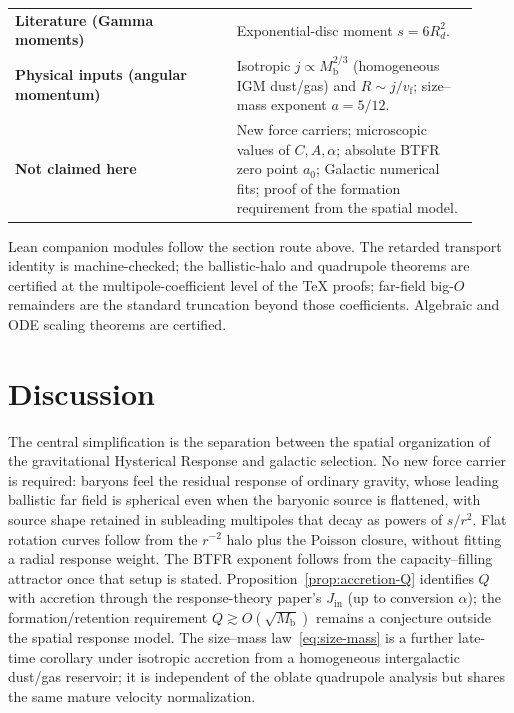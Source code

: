 \documentclass[11pt]{article}
\theoremstyle{definition}
\theoremstyle{remark}
\newcommand{\Mb}{M_{\mathrm{b}}}
\newcommand{\vf}{v_{\mathrm{f}}}
\begin{document}
\begin{center}
\begin{tabular}{@{}p{0.44\linewidth}p{0.48\linewidth}@{}}
\textbf{Literature (Gamma moments)} & Exponential-disc moment $s=6R_{d}^{2}$.\\
\textbf{Physical inputs (angular momentum)} & Isotropic $j\propto\Mb^{2/3}$ (homogeneous IGM dust/gas) and $R\sim j/\vf$; size--mass exponent $a=5/12$.\\
\textbf{Not claimed here} & New force carriers; microscopic values of $C,A,\alpha$; absolute BTFR zero point $a_0$; Galactic numerical fits; proof of the formation requirement from the spatial model.\\
\bottomrule
\end{tabular}
\end{center}

Lean companion modules follow the section route above.
The retarded transport identity is machine-checked; the ballistic-halo and quadrupole theorems are certified at the multipole-coefficient level of the TeX proofs; far-field big-$O$ remainders are the standard truncation beyond those coefficients. Algebraic and ODE scaling theorems are certified.


\section{Discussion}
\label{sec:discussion}
The central simplification is the separation between the spatial organization of the gravitational Hysterical Response and galactic selection.
No new force carrier is required: baryons feel the residual response of ordinary gravity, whose leading ballistic far field is spherical even when the baryonic source is flattened, with source shape retained in subleading multipoles that decay as powers of $s/r^{2}$.
Flat rotation curves follow from the $r^{-2}$ halo plus the Poisson closure, without fitting a radial response weight.
The BTFR exponent follows from the capacity--filling attractor once that setup is stated.
Proposition~\ref{prop:accretion-Q} identifies $Q$ with accretion through the response-theory paper's $J_{\mathrm{in}}$ (up to conversion $\alpha$); the formation/retention requirement $\boxed{Q\gtrsim O(\sqrt{\Mb})}$ remains a conjecture outside the spatial response model.
The size--mass law~\eqref{eq:size-mass} is a further late-time corollary under isotropic accretion from a homogeneous intergalactic dust/gas reservoir; it is independent of the oblate quadrupole analysis but shares the same mature velocity normalization.
\end{document}
